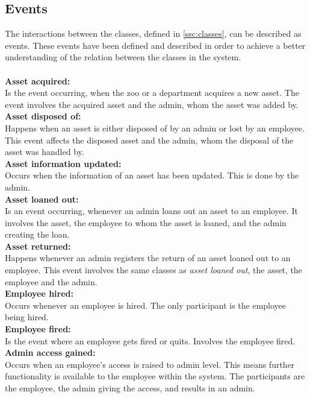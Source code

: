 \subsection{Events}\label{ssc:events}
The interactions between the classes, defined in \autoref{ssc:classes}, can be described as events. These events have been defined and described in order to achieve a better understanding of the relation between the classes in the system.
\\\\
\textbf{Asset acquired:}\\
Is the event occurring, when the zoo or a department acquires a new asset. The event involves the acquired asset and the admin, whom the asset was added by.\\

\textbf{Asset disposed of:}\\
Happens when an asset is either disposed of by an admin or lost by an employee. This event affects the disposed asset and the admin, whom the disposal of the asset was handled by.\\

\textbf{Asset information updated:}\\
Occurs when the information of an asset has been updated. This is done by the admin.\\

\textbf{Asset loaned out:}\\
Is an event occurring, whenever an admin loans out an asset to an employee. It involves the asset, the employee to whom the asset is loaned, and the admin creating the loan.\\

\textbf{Asset returned:}\\
Happens whenever an admin registers the return of an asset loaned out to an employee. This event involves the same classes as \textit{asset loaned out}, the asset, the employee and the admin.\\

\textbf{Employee hired:}\\
Occurs whenever an employee is hired. The only participant is the employee being hired.\\

\textbf{Employee fired:}\\
Is the event where an employee gets fired or quits. Involves the employee fired.\\

\textbf{Admin access gained:}\\
Occurs when an employee's access is raised to admin level. This means further functionality is available to the employee within the system. The participants are the employee, the admin giving the access, and results in an admin.\\

